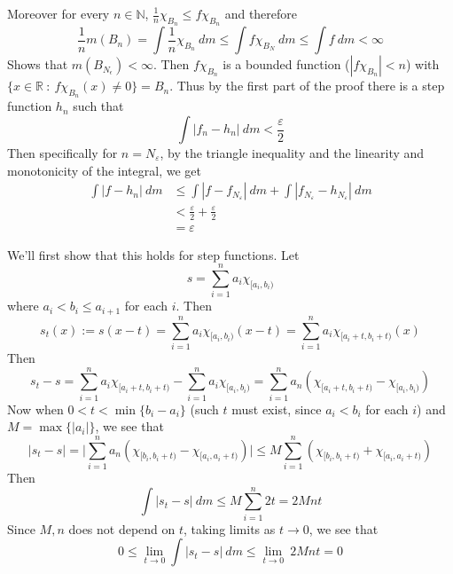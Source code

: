 \documentclass[12pt]{exam}
\theoremstyle{plain} %
\theoremstyle{definition} %
\theoremstyle{remark} %
\begin{document}
\begin{questions}
\begin{solution}
    Moreover for every $n \in \mathbb{N}$, $\frac{1}{n}\chi_{B_n} \le
    f \chi_{B_n}$ and therefore \[
      \frac{1}{n} m(B_n) = \int \frac{1}{n}\chi_{B_n} \ d m \le
      \int f \chi_{B_N} \ d m \le \int f \ d m < \infty
    \]
    Shows that $m(B_{N_\epsilon}) < \infty$. Then $f \chi_{B_n}$ is a bounded
    function ($|f \chi_{B_n}|< n$) with $\{ x \in \mathbb{R}  \ :
    \ f\chi_{B_n}(x) \neq 0  \} = B_n$. Thus by the first part of the
    proof there is a step function $h_n$ such that \[
      \int |f_n - h_n| \ d m < \frac{\varepsilon}{2}
    \]
    Then specifically for $n = N_\varepsilon$, by the triangle
    inequality and the linearity and monotonicity of the integral, we get
    \begin{align*}
      \int |f - h_n| \ d m &\le \int |f - f_{N_\varepsilon}| \ d m +
      \int |f_{N_\varepsilon} - h_{N_\varepsilon}| \ d m \\
      &< \frac{\varepsilon}{2} + \frac{\varepsilon}{2} \\
      &= \varepsilon
    \end{align*}
  \end{solution}

  \question
  \begin{solution}
    We'll first show that this holds for step functions. Let \[
      s = \sum_{i = 1}^{n} a_i \chi_{[a_i, b_i)}
    \]
    where $a_i < b_i \le a_{i+1}$ for each $i$. Then \[
      s_t(x) := s(x-t) = \sum_{i = 1}^{n} a_i \chi_{[a_i, b_i)}(x-t)
      = \sum_{i = 1}^{n} a_i\chi_{[a_i+t, b_i+t)}(x)
    \]
    Then \[
      s_t - s = \sum_{i = 1}^{n} a_i\chi_{[a_i+t, b_i+t)} -
      \sum_{i = 1}^{n} a_i \chi_{[a_i, b_i)} = \sum_{i = 1}^{n} a_n
      (\chi_{[a_i + t, b_i +t)} - \chi_{[a_i, b_i)})
    \]
    Now when $0 < t < \min\{b_i - a_i\}$ (such $t$ must exist, since
    $a_i < b_i$ for each $i$) and $M = \max\{|a_i|\}$, we see that \[
      |s_t - s| = \Bigg|\sum_{i = 1}^{n} a_n (\chi_{[b_i, b_i + t)} -
      \chi_{[a_i, a_i + t)})\Bigg| \le M \sum_{i = 1}^{n}
      (\chi_{[b_i, b_i + t)} +
      \chi_{[a_i, a_i + t)})
    \]
    Then   \[
      \int |s_t - s| \ d m \le M \sum_{i = 1}^{n} 2t = 2Mnt
    \]
    Since $M, n$ does not depend on $t$, taking limits as $t \to 0$,
    we see that \[
      0 \le \lim_{t \to 0} \int |s_t - s| \ d m \le \lim_{t \to 0}\  2Mnt = 0
    \]


\end{solution}
\end{questions}
\end{document}
